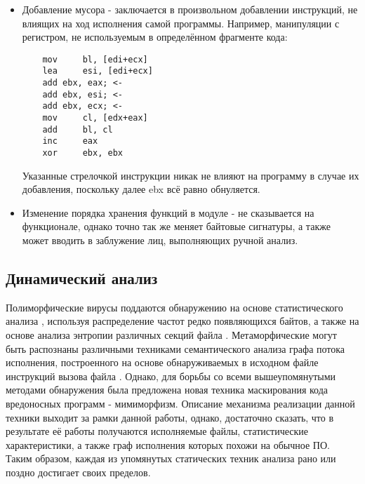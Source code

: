 \begin {itemize}
\begin{lstlisting}
	push    offset aRightAnswer; 1
	push    [ebp+hWnd]; 1
	call    MessageBoxA; 1
	jmp     short loc_4012E8
loc_4012D4:
	push    10h; 2
	push    offset aCaption; 2
	push    offset aWrongAnswer; 2
	push    [ebp+hWnd]; 2
	call    MessageBoxA; 2
loc_4012E8:
	call    ExitProcess
	\end{lstlisting}
	Замена первоначальной инструкции jnz на jz (переход в случае неравенства на переход в случае равенства) и перестановка местами блоков, помеченных как 1 и 2 не меняет смысловую нагрузку, выполняемую программой, однако позволяет значительно поменять её структуру. Это создаёт значительные трудности как в случае автоматического, так и ручного исследования, если таковых замен произведено значительное количество.
	\item Добавление мусора - заключается в произвольном добавлении инструкций, не влиящих на ход исполнения самой программы. Например, манипуляции с регистром, не используемым в определённом фрагменте кода:
	\begin{lstlisting}
	mov     bl, [edi+ecx]
	lea     esi, [edi+ecx]
	add ebx, eax; <-
	add ebx, esi; <-
	add ebx, ecx; <-
	mov     cl, [edx+eax]
	add     bl, cl
	inc     eax
	xor     ebx, ebx
	\end{lstlisting}
	Указанные стрелочкой инструкции никак не влияют на программу в случае их добавления, поскольку далее ebx всё равно обнуляется.
	\item Изменение порядка хранения функций в модуле - не сказывается на функционале, однако точно так же меняет байтовые сигнатуры, а также может вводить в заблужение лиц, выполняющих ручной анализ.
\end {itemize}

\subsection{Динамический анализ}
Полиморфические вирусы поддаются обнаружению на основе статистического анализа \cite{PAYLOADDETECTION, ANAGRAM}, используя распределение частот редко появляющихся байтов, а также на основе анализа энтропии различных секций файла \cite{ENTROPYANALYSIS}. Метаморфические могут быть распознаны различными техниками семантического анализа графа потока исполнения, построенного на основе обнаруживаемых в исходном файле инструкций вызова файла \cite{METAAWARE}. Однако, для борьбы со всеми вышеупомянутыми методами обнаружения была предложена новая техника маскирования кода вредоносных программ - мимиморфизм\cite{MIMIMORPHISM}. Описание механизма реализации данной техники выходит за рамки данной работы, однако, достаточно сказать, что в результате её работы получаются исполняемые файлы, статистические характеристики, а также граф исполнения которых похожи на обычное ПО. Таким образом, каждая из упомянутых статических техник анализа рано или поздно достигает своих пределов.

